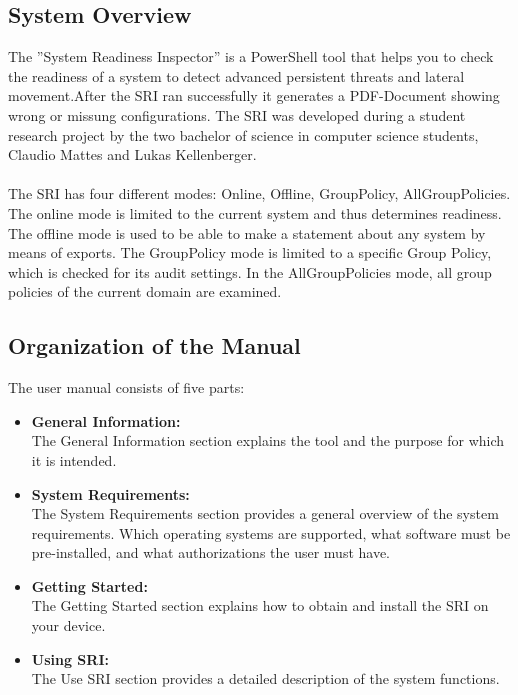 
 \label{GeneralInfo}
\thispagestyle{plain}
\renewcommand\section{\stdsection}
\setcounter{section}{1}
\subsection{System Overview}
The ''System Readiness Inspector'' is a PowerShell tool that helps you to check the readiness of a system to detect advanced persistent threats and lateral movement.After the SRI ran successfully it generates a PDF-Document showing wrong or missung configurations. The SRI was developed during a student research project by the two bachelor of science in computer science students, Claudio Mattes and Lukas Kellenberger.
\\\\
The SRI has four different modes: Online, Offline, GroupPolicy, AllGroupPolicies. The online mode is limited to the current system and thus determines readiness. The offline mode is used to be able to make a statement about any system by means of exports.
The GroupPolicy mode is limited to a specific Group Policy, which is checked for its
audit settings. In the AllGroupPolicies mode, all group policies of the current domain are examined.

\subsection{Organization of the Manual}
The user manual consists of five parts: 
\begin{itemize}
    \item \textbf{General Information:} \ \\
The General Information section explains the tool and the purpose for which it is intended.
    \item \textbf{System Requirements: } \ \\
The System Requirements section provides a general overview of the system requirements. Which operating systems are supported, what software must be pre-installed, and what authorizations the user must have.
    \item \textbf{Getting Started: } \ \\
The Getting Started section explains how to obtain and install the SRI on your device. 
    \item \textbf{Using SRI: }\ \\
The Use SRI section provides a detailed description of the system functions. 
\end{itemize}
